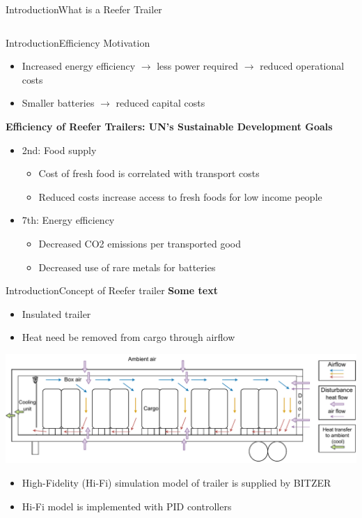 \begin{frame}{Introduction}{What is a Reefer Trailer}
\begin{columns}
\begin{column}{.5\textwidth}
 		\end{column}
 	\end{columns}	
\end{frame}


\begin{frame}{Introduction}{Efficiency Motivation}
	\begin{itemize}
		\item Increased energy efficiency $\rightarrow$ less power required $\rightarrow$ reduced operational costs  
		\item Smaller batteries $\rightarrow$ reduced capital costs		
	\end{itemize}
	\textbf{Efficiency of Reefer Trailers: UN's Sustainable Development Goals}
	\begin{itemize}	
		\item 2nd: Food supply
		\begin{itemize}
			\item Cost of fresh food is correlated with transport costs
			\item Reduced costs increase access to fresh foods for low income people		
		\end{itemize}
		\item 7th: Energy efficiency
		\begin{itemize}
			\item Decreased CO2 emissions per transported good
			\item Decreased use of rare metals for batteries	
		\end{itemize}
	\end{itemize}	
\end{frame}

\begin{frame}{Introduction}{Concept of Reefer trailer}
	\textbf{Some text}
	\begin{itemize}
		\item Insulated trailer
		\item Heat need be removed from cargo through airflow	
	\end{itemize}
	\includegraphics[width=1\textwidth]{../Graphics/Trailer_airflow.pdf}
	\begin{itemize}
		\item High-Fidelity (Hi-Fi) simulation model of trailer is supplied by BITZER
		\item Hi-Fi model is implemented with PID controllers
	\end{itemize}
\end{frame}

